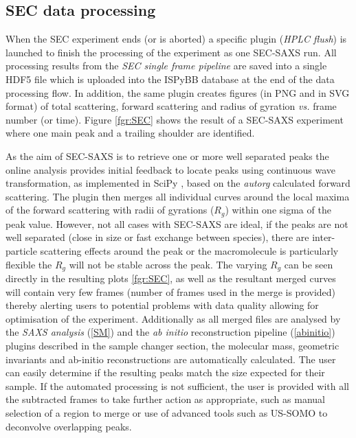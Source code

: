 \documentclass[preprint,pdf]{iucr}              %
\begin{document}
\subsection{SEC data processing}
When the SEC experiment ends (or is aborted) a specific plugin (\textit{HPLC
flush}) is launched to finish the processing of the experiment as one SEC-SAXS
run.  
All processing results from the \textit{SEC single frame pipeline} are saved
into a single HDF5 file which is uploaded into the ISPyBB database at the end of
the data processing flow.  
In addition, the same plugin creates figures (in PNG and in SVG format) of 
total scattering, forward scattering and radius of gyration \textit{vs.} frame
number (or time).  
Figure \ref{fgr:SEC} shows the result of a SEC-SAXS experiment where one main
peak and a trailing shoulder are identified. 

As the aim of SEC-SAXS is to retrieve one or more well separated peaks the
online analysis provides initial feedback to locate peaks using continuous wave
transformation, as implemented in SciPy \cite{cwt,scipy}, based on the
\textit{autorg} calculated forward scattering.   
The plugin then merges all individual curves around the local maxima of the
forward scattering with radii of gyrations ($R_g$) within one sigma of the peak
value.  
However, not all cases with SEC-SAXS are ideal, if the peaks are not well
separated (close in size or fast exchange between species), there are
inter-particle scattering effects around the peak or the macromolecule is
particularly flexible the $R_{g}$ will not be stable across the peak.   
The varying $R_{g}$ can be seen directly in the resulting plots \ref{fgr:SEC},
as well as the resultant merged curves will contain very few frames (number of
frames used in the merge is provided) thereby alerting users to potential
problems with data quality allowing for optimisation of the experiment.   
Additionally as all merged files are analysed by the \textit{SAXS analysis}
(\ref{SM}) and the \textit{ab initio} reconstruction pipeline (\ref{abinitio})
plugins described in the sample changer section, the molecular mass, geometric
invariants and ab-initio reconstructions are automatically calculated.  
The user can easily determine if the resulting peaks match the size expected for
their sample. 
If the automated processing is not sufficient, the user is provided with all the
subtracted frames to take further action as appropriate, such as  manual
selection of a region to merge or use of advanced tools such as US-SOMO
\cite{USSOMO} to deconvolve overlapping peaks.   
\end{document}
